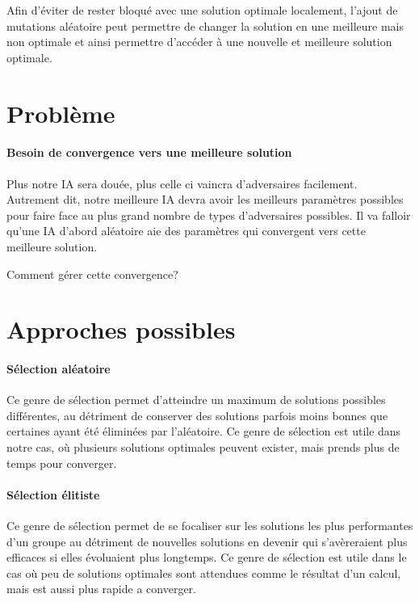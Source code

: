\documentclass{scrreprt}
\begin{document}
			Afin d'éviter de rester bloqué avec une solution optimale localement, l'ajout de mutations aléatoire peut permettre de changer la solution  en une meilleure mais non optimale et ainsi permettre d'accéder à une nouvelle et meilleure solution optimale.
			
		\section{Problème}
		
			\paragraph{Besoin de convergence vers une meilleure solution}
			
			Plus notre IA sera douée, plus celle ci vaincra d'adversaires facilement. Autrement dit, notre meilleure IA devra avoir les meilleurs paramètres possibles pour faire face au plus grand nombre de types d'adversaires possibles. Il va falloir qu'une IA d'abord aléatoire aie des paramètres qui convergent vers cette meilleure solution.
			
			Comment gérer cette convergence?
			
			
		\section{Approches possibles}
		
			
			\paragraph{Sélection aléatoire} 
			
			Ce genre de sélection permet d'atteindre un maximum de solutions possibles différentes, au détriment de conserver des solutions parfois moins bonnes que certaines ayant été éliminées par l'aléatoire. Ce genre de sélection est utile dans notre cas, où plusieurs solutions optimales peuvent exister, mais prends plus de temps pour converger.
			
			\paragraph{Sélection élitiste} 
			
			Ce genre de sélection permet de se focaliser sur les solutions les plus performantes d'un groupe au détriment de nouvelles solutions en devenir qui s'avèreraient plus efficaces si elles évoluaient plus longtemps. Ce genre de sélection est utile dans le cas où peu de solutions optimales sont attendues comme le résultat d'un calcul, mais est aussi plus rapide a converger.  
			
\end{document}
